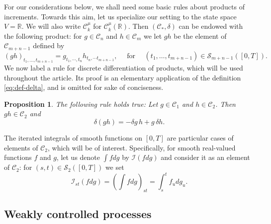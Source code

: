 \documentclass[12pt,reqno]{amsart}
\numberwithin{equation}{section}  %
\newcommand{\der}{\delta}
\newcommand{\1}{{\bf 1}}
\newcommand{\2}{{\bf 2}}
\newcommand{\R}{\mathbb R}
\newcommand{\cac}{\mathcal C}
\newtheorem{proposition}[theorem]{Proposition}
\theoremstyle{remark}
\theoremstyle{remark}
\begin{document}
For our considerations below, we shall need some basic rules about products of increments. Towards this aim, let us specialize our setting to the state space $V=\R$. We will also write $\mathcal{C}_{k}^{\mu}$ for $\mathcal{C}_{k}^{\mu}(\R)$. Then $\left(\mathcal{C}_{\ast}, \der\right)$ can be endowed with the following product: for $g \in \mathcal{C}_n$ and $h \in \mathcal{C}_m$ we let $gh$ be the element of $\mathcal{C}_{m+n-1}$ defined by
\begin{equation*}
(gh)_{t_1, \ldots, t_{m+n-1}} = g_{t_1, \cdots, t_n}h_{t_n,\cdots t_{m+n-1}},
\quad\text{  for  }\quad
(t_1, \ldots, t_{m+n-1}) \in \mathcal{S}_{m+n-1}([0,T]).
\end{equation*}
We now label a rule for discrete differentiation of products, which will be used throughout the article. Its proof is an elementary application of the definition \eqref{eq:def-delta}, and is omitted for sake of conciseness.
\begin{proposition}\label{prop:der_rules}
	The following rule holds true:
	Let $g \in \cac_1$ and $h \in \cac_2$. Then $gh \in \cac_2$ and
	\begin{equation*}
	\der(gh) = -\der g\, h + g\, \der h .
	\end{equation*}
\end{proposition}



\noindent
The iterated integrals of smooth functions on $[0,T]$ are particular cases of elements of $\cac_2$, which will be of interest. Specifically, for smooth real-valued functions $f$ and $g$, let us denote $\int f dg$ by $\mathcal{I}(f dg)$ and consider it as an element of $\cac_2$: for $(s,t) \in \mathcal{S}_{2}\left([0,T]\right)$ we set
\begin{equation*}
\mathcal{I}_{st} (f dg) = \left(\int f dg\right)_{st} = \int_{s}^{t} f_u dg_u .
\end{equation*}

\subsection{Weakly controlled processes}\label{sec:weak-contr}
\end{document}
